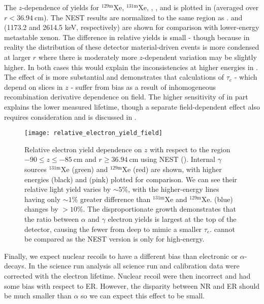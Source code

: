 The $z$-dependence of \electron yields for $\mathrm{^{129m}Xe}$, $\mathrm{^{131m}Xe}$, , , and  is
plotted in  (averaged over $r < 36.94\ \mathrm{cm}$).  The NEST results are
normalized to the same region as .   and  (1173.2 and
2614.5 keV, respectively) are shown for comparison with lower-energy metastable xenon.  The difference in relative yields is
small - though because in reality the distribution of these detector material-driven events is more condensed at larger $r$ where there
is moderately more $z$-dependent variation may be slightly higher.  In both cases this
would explain the inconsistencies at higher energies in .  The
effect of  is more substantial and demonstrates that calculations of $\tau_e$ - which depend on slices in $z$ - suffer from
bias as a result of inhomogeneous recombination derivative dependence on field.  The higher sensitivity of \alphadecays in part explains
the lower measured lifetime, though a separate field-dependent effect also requires consideration and is discussed in
.

\begin{figure}
\centering
\texttt{[image: relative\_electron\_yield\_field]}
\caption{Relative electron yield dependence on $z$ with respect to the region $-90 \leq z \leq -85\ \mathrm{cm}$ and
$r \geq 36.94\ \mathrm{cm}$ using NEST ().  Internal $\gamma$ sources $\mathrm{^{131m}Xe}$ (green) and
$\mathrm{^{129m}Xe}$
(red) are shown, with higher energies  (black) and  (pink) plotted for comparison.  We can see their relative
light yield varies by ${\sim} 5\%$, with the higher-energy lines having only ${\sim} 1\%$ greater difference than $\mathrm{^{131m}Xe}$ and
$\mathrm{^{129m}Xe}$.   (blue) changes by $> 10\%$.  The disproportionate growth demonstrates that the ratio between
$\alpha$ and $\gamma$ electron yields is largest at the top of the detector, causing the fewer \electron from deep \alphadecays to
mimic a smaller $\tau_e$.  \metakr cannot be compared as the NEST version is only for high-energy.}
\label{fig:electron_lifetimes_rn222_vs_kr83m_field_z}
\end{figure}

Finally, we expect nuclear recoils to have a different bias than electronic or $\alpha$-decays.  In the science run analysis all
science run and calibration data were corrected with the \metakr electron lifetime.  Nuclear recoil \cstwob were then incorrect and had
some bias with respect to ER.  However, the disparity between NR and ER should be much smaller than $\alpha$ so we can expect this effect
to be small.



